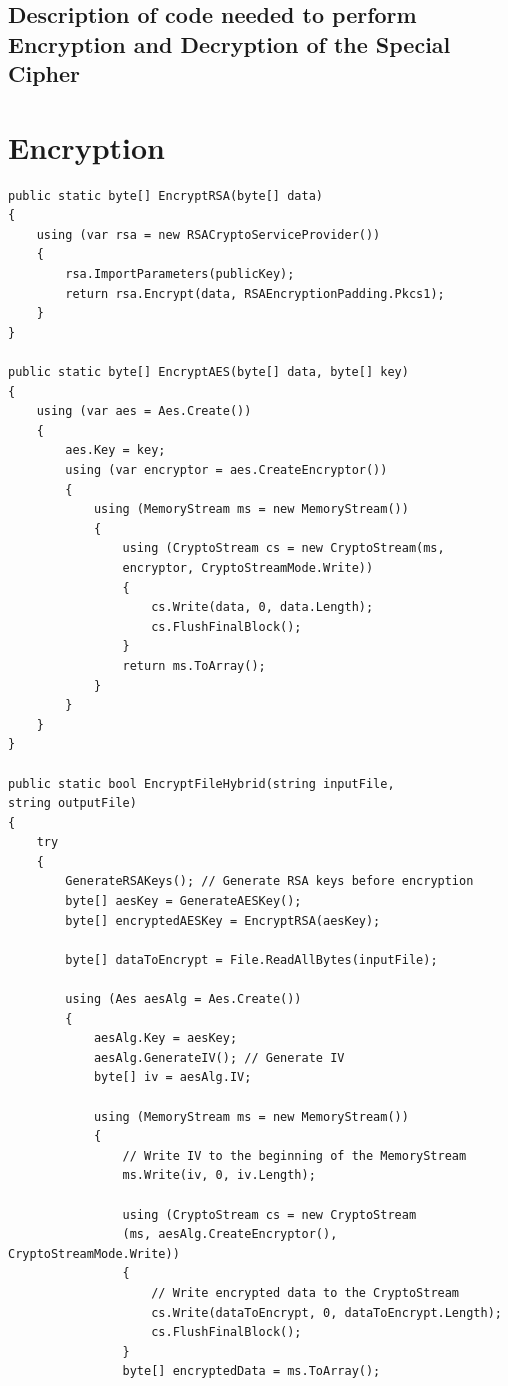 \documentclass[a4paper,oneside,11pt]{book}
\begin{document}
\subsection{Description of code needed to perform Encryption and Decryption of the Special Cipher}


\section{Encryption}
\begin{lstlisting}[language=Csh, caption={Code for Special Cipher Encryption}]
public static byte[] EncryptRSA(byte[] data)
{
    using (var rsa = new RSACryptoServiceProvider())
    {
        rsa.ImportParameters(publicKey);
        return rsa.Encrypt(data, RSAEncryptionPadding.Pkcs1);
    }
}

public static byte[] EncryptAES(byte[] data, byte[] key)
{
    using (var aes = Aes.Create())
    {
        aes.Key = key;
        using (var encryptor = aes.CreateEncryptor())
        {
            using (MemoryStream ms = new MemoryStream())
            {
                using (CryptoStream cs = new CryptoStream(ms, 
                encryptor, CryptoStreamMode.Write))
                {
                    cs.Write(data, 0, data.Length);
                    cs.FlushFinalBlock();
                }
                return ms.ToArray();
            }
        }
    }
}

public static bool EncryptFileHybrid(string inputFile, 
string outputFile)
{
    try
    {
        GenerateRSAKeys(); // Generate RSA keys before encryption
        byte[] aesKey = GenerateAESKey();
        byte[] encryptedAESKey = EncryptRSA(aesKey);
    
        byte[] dataToEncrypt = File.ReadAllBytes(inputFile);
    
        using (Aes aesAlg = Aes.Create())
        {
            aesAlg.Key = aesKey;
            aesAlg.GenerateIV(); // Generate IV
            byte[] iv = aesAlg.IV;
    
            using (MemoryStream ms = new MemoryStream())
            {
                // Write IV to the beginning of the MemoryStream
                ms.Write(iv, 0, iv.Length);
    
                using (CryptoStream cs = new CryptoStream
                (ms, aesAlg.CreateEncryptor(), CryptoStreamMode.Write))
                {
                    // Write encrypted data to the CryptoStream
                    cs.Write(dataToEncrypt, 0, dataToEncrypt.Length);
                    cs.FlushFinalBlock();
                }
                byte[] encryptedData = ms.ToArray();
    

\end{lstlisting}
\end{document}
